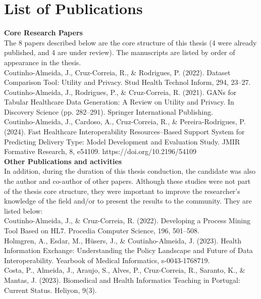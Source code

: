 \chapter*{List of Publications}



\textbf{Core Research Papers} \\
The 8 papers described below are the core structure of this thesis (4 were already published, and 4 are under review). The manuscripts are listed by order of appearance in the thesis.
\\

Coutinho-Almeida, J., Cruz-Correia, R., \& Rodrigues, P. (2022). Dataset Comparison Tool: Utility and Privacy. Stud Health Technol Inform, 294, 23–27.\\

Coutinho-Almeida, J., Rodrigues, P., \& Cruz-Correia, R. (2021). GANs for Tabular Healthcare Data Generation: A Review on Utility and Privacy. In Discovery Science (pp. 282–291). Springer International Publishing.\\

Coutinho-Almeida, J., Cardoso, A., Cruz-Correia, R., \& Pereira-Rodrigues, P. (2024). Fast Healthcare Interoperability Resources–Based Support System for Predicting Delivery Type: Model Development and Evaluation Study. JMIR Formative Research, 8, e54109. https://doi.org/10.2196/54109\\




\textbf{Other Publications and activities}\\
In addition, during the duration of this thesis conduction, the candidate was also the author and co-author of other papers. Although these studies were not part of the thesis core structure, they were important to improve the researcher's knowledge of the field and/or to present the results to the community. They are listed below:\\


Coutinho-Almeida, J., \& Cruz-Correia, R. (2022). Developing a Process Mining Tool Based on HL7. Procedia Computer Science, 196, 501–508.\\


Holmgren, A., Esdar, M., Hüsers, J., \& Coutinho-Almeida, J. (2023). Health Information Exchange: Understanding the Policy Landscape and Future of Data Interoperability. Yearbook of Medical Informatics, s-0043-1768719.\\



Costa, P., Almeida, J., Araujo, S., Alves, P., Cruz-Correia, R., Saranto, K., \& Mantas, J. (2023). Biomedical and Health Informatics Teaching in Portugal: Current Status. Heliyon, 9(3).\\

